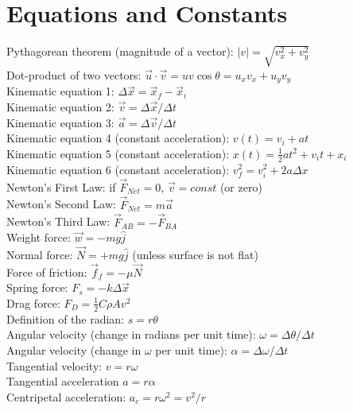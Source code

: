 \documentclass[10pt]{article}
\begin{document}
\maketitle
\small
\section{Equations and Constants}
Pythagorean theorem (magnitude of a vector): $|v| = \sqrt{v_x^2+v_y^2}$ \\
Dot-product of two vectors: $\vec{u} \cdot \vec{v} = uv\cos\theta = u_x v_x + u_y v_y$ \\
Kinematic equation 1: $\Delta \vec{x} = \vec{x}_f - \vec{x}_i$ \\
Kinematic equation 2: $\vec{v} = \Delta \vec{x}/\Delta t$ \\
Kinematic equation 3: $\vec{a} = \Delta \vec{v}/\Delta t$ \\
Kinematic equation 4 (constant acceleration): $v(t) = v_i + at$ \\
Kinematic equation 5 (constant acceleration): $x(t) = \frac{1}{2}at^2+v_i t+x_i$ \\
Kinematic equation 6 (constant acceleration): $v_f^2 = v_i^2 + 2 a \Delta x$ \\
Newton's First Law: if $\vec{F}_{Net} = 0$, $\vec{v} = const$ (or zero) \\
Newton's Second Law: $\vec{F}_{Net} = m \vec{a}$ \\
Newton's Third Law: $\vec{F}_{AB} = - \vec{F}_{BA}$ \\
Weight force: $\vec{w} = -mg\hat{j}$ \\
Normal force: $\vec{N} = +mg\hat{j}$ (unless surface is not flat) \\
Force of friction: $\vec{f}_f = -\mu \vec{N}$ \\
Spring force: $F_s = -k\Delta \vec{x}$ \\
Drag force: $F_D = \frac{1}{2}C\rho A v^2$ \\
Definition of the radian: $s = r \theta$ \\
Angular velocity (change in radians per unit time): $\omega = \Delta \theta/\Delta t$ \\
Angular velocity (change in $\omega$ per unit time): $\alpha = \Delta \omega/\Delta t$ \\
Tangential velocity: $v = r\omega$ \\
Tangential acceleration $a = r\alpha$ \\
Centripetal acceleration: $a_c = r\omega^2 = v^2/r$ \\
\end{document}
